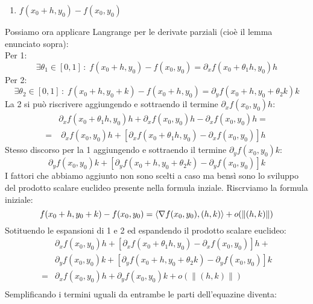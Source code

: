 {\begin{enumerate}
		\item $f(x_0 + h, y_0) - f(x_0, y_0)$
	\end{enumerate}
	Possiamo ora applicare Langrange per le derivate parziali (cioè il lemma enunciato sopra):\\
	Per 1:
	\begin{equation*}
		\exists \theta_1 \in [0, 1] \, : \; f(x_0 + h, y_0) - f(x_0, y_0) = \partial_x f(x_0 + \theta_1 h, y_0)h
	\end{equation*}
	Per 2:
	\begin{equation*}
		\exists \theta_2 \in [0, 1] \, : \; f(x_0 + h, y_0 + k) - f(x_0 + h, y_0) = \partial_y f(x_0 + h, y_0 + \theta_2 k)k
	\end{equation*}
	La 2 si può riscrivere aggiungendo e sottraendo il termine $\partial_x f(x_0, y_0) h$:
	\begin{align*}
		&\partial_x f(x_0 + \theta_1 h, y_0)h + \partial_x f(x_0, y_0) h - \partial_x f(x_0, y_0) h =\\[5pt]
		= &\; \partial_x f(x_0, y_0) h + [\partial_x f(x_0 + \theta_1 h, y_0) - \partial_x f(x_0, y_0) ]h
	\end{align*}
	Stesso discorso per la 1 aggiungendo e sottraendo il termine $\partial_y f(x_0, y_0) k$:
	\begin{equation*}
		\partial_y f(x_0, y_0) k + [\partial_y f(x_0 + h, y_0 + \theta_2 k) - \partial_y f(x_0, y_0)]k
	\end{equation*}
	I fattori che abbiamo aggiunto non sono scelti a caso ma bensì sono lo sviluppo del prodotto scalare euclideo presente nella formula inziale. Riscrviamo la formula iniziale:
	\begin{equation*}
		f(x_0 + h, y_0 + k) - f(x_0, y_0) = \langle \nabla f(x_0, y_0), (h, k) \rangle + o(\lVert (h, k) \rVert)\\
	\end{equation*}
	Sotituendo le espansioni di 1 e 2 ed espandendo il prodotto scalare euclideo:
	\begin{align*}
		&\partial_x f(x_0, y_0) h + [\partial_x f(x_0 + \theta_1 h, y_0) - \partial_x f(x_0, y_0) ]h +\\[2pt]
		&\partial_y f(x_0, y_0) k + [\partial_y f(x_0 + h, y_0 + \theta_2 k) - \partial_y f(x_0, y_0)]k \\[2pt]
		=& \partial_x f(x_0, y_0) h + \partial_y f(x_0, y_0) k + o(\lVert (h, k) \rVert)\\
	\end{align*}
	Semplificando i termini uguali da entrambe le parti dell'equazine diventa:
}

